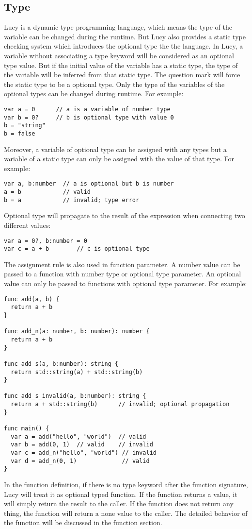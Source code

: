 \subsection{Type}
Lucy is a dynamic type programming language, which means the type of the variable can be changed during the runtime. But Lucy also provides a static type checking system which introduces the optional type the the language. In Lucy, a variable without associating a type keyword will be considered as an optional type value. But if the initial value of the variable has a static type, the type of the variable will be inferred from that static type. The question mark will force the static type to be a optional type. Only the type of the variables of the optional types can be changed during runtime. For example:
\begin{lstlisting}
var a = 0      // a is a variable of number type
var b = 0?     // b is optional type with value 0
b = "string"
b = false
\end{lstlisting}
Moreover, a variable of optional type can be assigned with any types but a variable of a static type can only be assigned with the value of that type. For example:
\begin{lstlisting}
var a, b:number  // a is optional but b is number
a = b            // valid
b = a            // invalid; type error
\end{lstlisting}
Optional type will propagate to the result of the expression when connecting two different values:
\begin{lstlisting}
var a = 0?, b:number = 0
var c = a + b        // c is optional type
\end{lstlisting}
The assignment rule is also used in function parameter. A number value can be passed to a function with number type or optional type parameter. An optional value can only be passed to functions with optional type parameter. For example:
\begin{lstlisting}
func add(a, b) {
  return a + b
}

func add_n(a: number, b: number): number {
  return a + b
}

func add_s(a, b:number): string {
  return std::string(a) + std::string(b)
}

func add_s_invalid(a, b:number): string {
  return a + std::string(b)      // invalid; optional propagation
}

func main() {
  var a = add("hello", "world")  // valid
  var b = add(0, 1)  // valid    // invalid
  var c = add_n("hello", "world") // invalid
  var d = add_n(0, 1)             // valid
}
\end{lstlisting}
In the function definition, if there is no type keyword after the function signature, Lucy will treat it as optional typed function. If the function returns a value, it will simply return the result to the caller. If the function does not return any thing, the function will return a none value to the caller. The detailed behavior of the function will be discussed in the function section.

